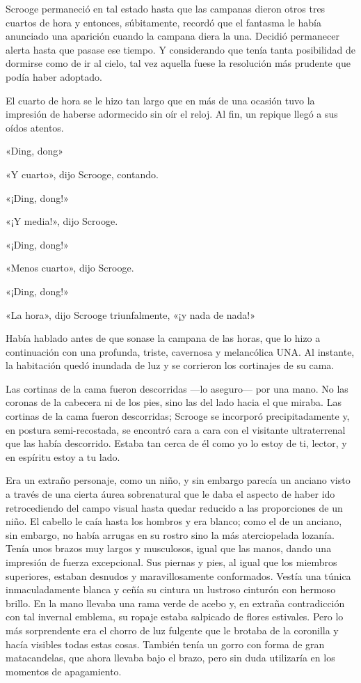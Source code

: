 \documentclass{novela}
\begin{document}
 Scrooge permaneció en tal estado hasta que las campanas dieron otros tres cuartos de hora y entonces, súbitamente, recordó que el fantasma le había anunciado una aparición cuando la campana diera la una. Decidió permanecer alerta hasta que pasase ese tiempo. Y considerando que tenía tanta posibilidad de dormirse como de ir al cielo, tal vez aquella fuese la resolución más prudente que podía haber adoptado.

 El cuarto de hora se le hizo tan largo que en más de una ocasión tuvo la impresión de haberse adormecido sin oír el reloj. Al fin, un repique llegó a sus oídos atentos.

 «Ding, dong»

 «Y cuarto», dijo Scrooge, contando.

 «¡Ding, dong!»

 «¡Y media!», dijo Scrooge.





 «¡Ding, dong!»

 «Menos cuarto», dijo Scrooge.

 «¡Ding, dong!»

 «La hora», dijo Scrooge triunfalmente, «¡y nada de nada!»

 Había hablado antes de que sonase la campana de las horas, que lo hizo a continuación con una profunda, triste, cavernosa y melancólica UNA\@. Al instante, la habitación quedó inundada de luz y se corrieron los cortinajes de su cama.

 Las cortinas de la cama fueron descorridas ---lo aseguro--- por una mano. No las coronas de la cabecera ni de los pies, sino las del lado hacia el que miraba. Las cortinas de la cama fueron descorridas; Scrooge se incorporó precipitadamente y, en postura semi-recostada, se encontró cara a cara con el visitante ultraterrenal que las había descorrido. Estaba tan cerca de él como yo lo estoy de ti, lector, y en espíritu estoy a tu lado.

 Era un extraño personaje, como un niño, y sin embargo parecía un anciano visto a través de una cierta áurea sobrenatural que le daba el aspecto de haber ido retrocediendo del campo visual hasta quedar reducido a las proporciones de un niño. El cabello le caía hasta los hombros y era blanco; como el de un anciano, sin embargo, no había arrugas en su rostro sino la más aterciopelada lozanía. Tenía unos brazos muy largos y musculosos, igual que las manos, dando una impresión de fuerza excepcional. Sus piernas y pies, al igual que los miembros superiores, estaban desnudos y maravillosamente conformados. Vestía una túnica inmaculadamente blanca y ceñía su cintura un lustroso cinturón con hermoso brillo. En la mano llevaba una rama verde de acebo y, en extraña contradicción con tal invernal emblema, su ropaje estaba salpicado de flores estivales. Pero lo más sorprendente era el chorro de luz fulgente que le brotaba de la coronilla y hacía visibles todas estas cosas. También tenía un gorro con forma de gran matacandelas, que ahora llevaba bajo el brazo, pero sin duda utilizaría en los momentos de apagamiento.
\end{document}
